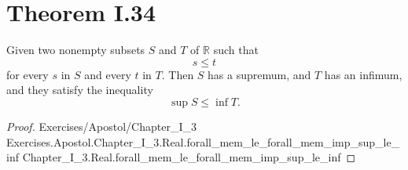 \documentclass{article}
\newcommand{\link}[1]{\lean{../..}
  {Exercises/Apostol/Chapter\_I\_3}
  {Exercises.Apostol.Chapter\_I\_3.Real.#1}
  {Chapter\_I\_3.Real.#1}
}
\begin{document}
\section*{Theorem I.34}%
\label{sec:theorem-i.34}

Given two nonempty subsets $S$ and $T$ of $\mathbb{R}$ such that
$$s \leq t$$
for every $s$ in $S$ and every $t$ in $T$. Then $S$ has a supremum, and $T$
has an infimum, and they satisfy the inequality
$$\sup{S} \leq \inf{T}.$$

\begin{proof}

  \link{forall\_mem\_le\_forall\_mem\_imp\_sup\_le\_inf}

\end{proof}
\end{document}
